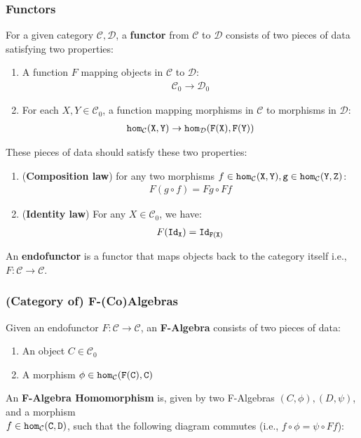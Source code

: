 \subsubsection{Functors}
For a given category $\mathcal{C}, \mathcal{D}$, a \textbf{functor} from $\mathcal{C}$ to $\mathcal{D}$ consists of two pieces of data satisfying two properties:
\begin{enumerate}
    \item A function $F$ mapping objects in $\mathcal{C}$ to $\mathcal{D}$: \begin{align*} \mathcal{C}_0 \to \mathcal{D}_0 \end{align*}
    \item For each $X,Y\in\mathcal{C}_0$, a function mapping morphisms in $\mathcal{C}$ to morphisms in $\mathcal{D}$: \begin{align*} \tt{hom}_\mathcal{C}(X,Y) \to \tt{hom}_\mathcal{D}(F(X),F(Y)) \end{align*}
\end{enumerate}
These pieces of data should satisfy these two properties:
\begin{enumerate}
    \item (\textbf{Composition law}) for any two morphisms $f\in\tt{hom}_\mathcal{C}(X,Y),g\in\tt{hom}_\mathcal{C}(Y,Z)$: \begin{align*} F(g\circ f) = F g \circ F f \end{align*}
    \item (\textbf{Identity law}) For any $X\in\mathcal{C}_0$, we have: \begin{align*} F(\tt{Id}_X) = \tt{Id}_{F(X)} \end{align*}
\end{enumerate}
An \textbf{endofunctor} is a functor that maps objects back to the category itself i.e., $F:\mathcal{C}\to\mathcal{C}$.

\subsubsection{(Category of) F-(Co)Algebras}
Given an endofunctor $F:\mathcal{C}\to\mathcal{C}$, an \textbf{F-Algebra} consists of two pieces of data:
\begin{enumerate}
    \item An object $C\in \mathcal{C}_0$
    \item A morphism $\phi\in\tt{hom}_\mathcal{C}(F(C),C)$
\end{enumerate}

An \textbf{F-Algebra Homomorphism} is, given by two F-Algebras $(C,\phi),(D,\psi)$, and a morphism\\ $f\in\tt{hom}_\mathcal{C}(C,D)$, such that the following diagram commutes (i.e., $f\circ\phi=\psi\circ Ff$):
\begin{figure}[H]\vspace{-1em}\hfill
{}\hfill\null
\end{figure}\vspace{-1em}


